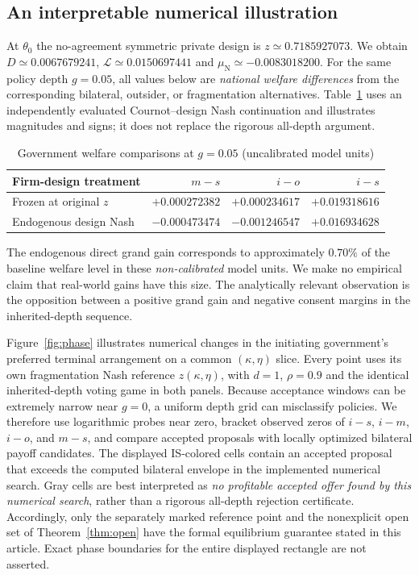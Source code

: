 \documentclass[11pt,a4paper]{article}
\theoremstyle{remark}\newtheorem{remark}[theorem]{Remark}
\newcommand{\N}{\mathrm{N}}\newcommand{\F}{\mathrm{F}}
\newcommand{\loss}{\mathcal L}\newcommand{\vect}[1]{\boldsymbol{#1}}
\begin{document}
\subsection{An interpretable numerical illustration}
At $\theta_0$ the no-agreement symmetric private design is $z\simeq0.7185927073$. We obtain $D\simeq0.0067679241$, $\loss\simeq0.0150697441$ and $\mu_{\N}\simeq-0.0083018200$. For the same policy depth $g=0.05$, all values below are \emph{national welfare differences} from the corresponding bilateral, outsider, or fragmentation alternatives. Table~\ref{tab:effects} uses an independently evaluated Cournot--design Nash continuation and illustrates magnitudes and signs; it does not replace the rigorous all-depth argument.
\begin{table}[ht]
\centering\small
\caption{Government welfare comparisons at $g=0.05$ (uncalibrated model units)}\label{tab:effects}
\begin{tabular}{lrrr}
\toprule
Firm-design treatment&$m-s$&$i-o$&$i-s$\\
\midrule
Frozen at original $z$&$+0.000272382$&$+0.000234617$&$+0.019318616$\\
Endogenous design Nash&$-0.000473474$&$-0.001246547$&$+0.016934628$\\
\bottomrule
\end{tabular}
\end{table}
The endogenous direct grand gain corresponds to approximately $0.70\%$ of the baseline welfare level in these \emph{non-calibrated} model units. We make no empirical claim that real-world gains have this size. The analytically relevant observation is the opposition between a positive grand gain and negative consent margins in the inherited-depth sequence.

Figure~\ref{fig:phase} illustrates numerical changes in the initiating government's preferred terminal arrangement on a common $(\kappa,\eta)$ slice. Every point uses its own fragmentation Nash reference $z(\kappa,\eta)$, with $d=1$, $\rho=0.9$ and the identical inherited-depth voting game in both panels. Because acceptance windows can be extremely narrow near $g=0$, a uniform depth grid can misclassify policies. We therefore use logarithmic probes near zero, bracket observed zeros of $i-s$, $i-m$, $i-o$, and $m-s$, and compare accepted proposals with locally optimized bilateral payoff candidates. The displayed IS-colored cells contain an accepted proposal that exceeds the computed bilateral envelope in the implemented numerical search. Gray cells are best interpreted as \emph{no profitable accepted offer found by this numerical search}, rather than a rigorous all-depth rejection certificate. Accordingly, only the separately marked reference point and the nonexplicit open set of Theorem~\ref{thm:open} have the formal equilibrium guarantee stated in this article. Exact phase boundaries for the entire displayed rectangle are not asserted.
\end{document}
